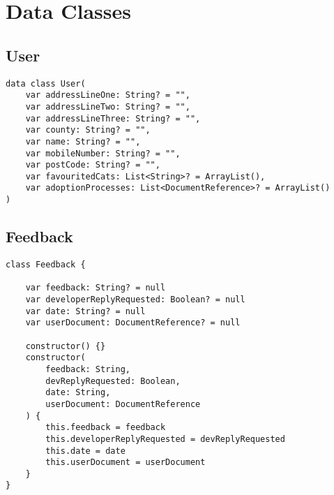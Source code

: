  

\section{Data Classes} \label {DATACLASSEXAMPLE}

\subsection{User}
\begin{verbatim}
data class User(
    var addressLineOne: String? = "",
    var addressLineTwo: String? = "",
    var addressLineThree: String? = "",
    var county: String? = "",
    var name: String? = "",
    var mobileNumber: String? = "",
    var postCode: String? = "",
    var favouritedCats: List<String>? = ArrayList(),
    var adoptionProcesses: List<DocumentReference>? = ArrayList()
)
\end{verbatim}
    
\subsection{Feedback}
\begin{verbatim}
class Feedback {

    var feedback: String? = null
    var developerReplyRequested: Boolean? = null
    var date: String? = null
    var userDocument: DocumentReference? = null

    constructor() {}
    constructor(
        feedback: String,
        devReplyRequested: Boolean,
        date: String,
        userDocument: DocumentReference
    ) {
        this.feedback = feedback
        this.developerReplyRequested = devReplyRequested
        this.date = date
        this.userDocument = userDocument
    }
}
\end{verbatim}

